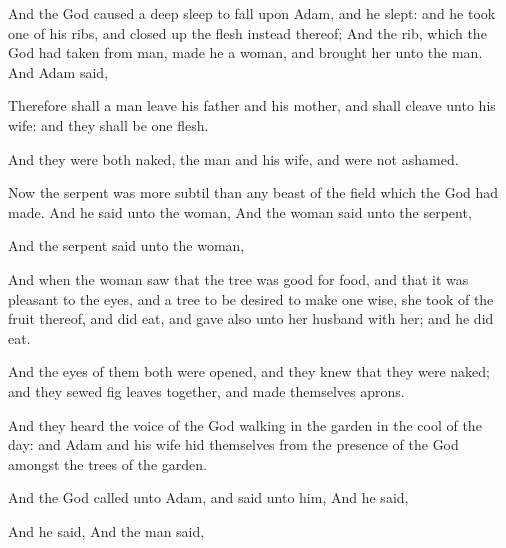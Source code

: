 \Verse And the \LORD God caused a deep sleep to fall upon Adam, and he slept: and he took one of his ribs, and closed up the flesh instead thereof; \Verse And the rib, which the \LORD God had taken from man, made he a woman, and brought her unto the man.
\Verse And Adam said, 

\Verse Therefore shall a man leave his father and his mother, and shall cleave unto his wife: and they shall be one flesh.

\Verse And they were both naked, the man and his wife, and were not ashamed.

\Chapter
\Verse Now the serpent was more subtil than any beast of the field which the \LORD God had made.  And he said unto the woman,   \Verse And the woman said unto the serpent, 

\Verse And the serpent said unto the woman, 

\Verse And when the woman saw that the tree was good for food, and that it was pleasant to the eyes, and a tree to be desired to make one wise, she took of the fruit thereof, and did eat, and gave also unto her husband with her; and he did eat.

\Verse And the eyes of them both were opened, and they knew that they were naked; and they sewed fig leaves together, and made themselves aprons.

\Verse And they heard the voice of the \LORD God walking in the garden in the cool of the day: and Adam and his wife hid themselves from the presence of the \LORD God amongst the trees of the garden.

\Verse And the \LORD God called unto Adam, and said unto him,   \Verse And he said, 

\Verse And he said,   \Verse And the man said, 

